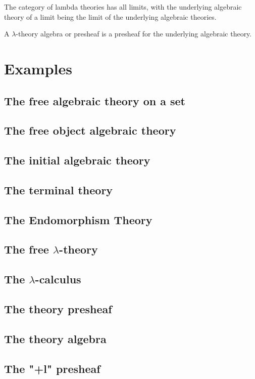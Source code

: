 \begin{remark}
  The category of lambda theories has all limits, with the underlying algebraic theory of a limit being the limit of the underlying algebraic theories.
\end{remark}

A $ \lambda $-theory algebra or presheaf is a presheaf for the underlying algebraic theory.

\section{Examples}

\subsection{The free algebraic theory on a set}
\subsection{The free object algebraic theory}
\subsection{The initial algebraic theory}

\subsection{The terminal theory}
\subsection{The Endomorphism Theory}
\subsection{The free \texorpdfstring{$ \lambda $}{lambda}-theory}
\subsection{The \texorpdfstring{$ \lambda $}{lambda}-calculus}
\subsection{The theory presheaf}
\subsection{The theory algebra}
\subsection{The "+l" presheaf}

